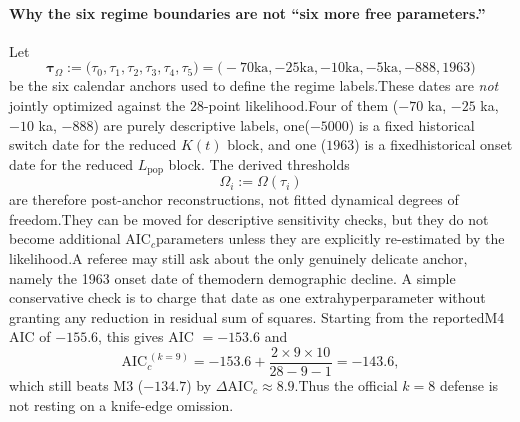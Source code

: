 \documentclass[11pt]{article}
\begin{document}
\paragraph{Why the six regime boundaries are not ``six more free parameters.''}
Let
\begin{equation}\boldsymbol{\tau}_{\Omega}:=\bigl(\tau_0,\tau_1,\tau_2,\tau_3,\tau_4,\tau_5\bigr)=\bigl(-70\mathrm{ka},-25\mathrm{ka},-10\mathrm{ka},-5\mathrm{ka},-888,1963\bigr)\tag{S4.3}\label{eq:S4_tauOmega}\end{equation}
be the six calendar anchors used to define the regime labels.These dates are \emph{not} jointly optimized against the 28-point likelihood.Four of them ($-70$ ka, $-25$ ka, $-10$ ka, $-888$) are purely descriptive labels, one($-5000$) is a fixed historical switch date for the reduced $K(t)$ block, and one ($1963$) is a fixedhistorical onset date for the reduced $L_{\mathrm{pop}}$ block. The derived thresholds
\begin{equation}\Omega_i := \Omega(\tau_i)\tag{S4.4}\label{eq:S4_Omegai_def}\end{equation}
are therefore post-anchor reconstructions, not fitted dynamical degrees of freedom.They can be moved for descriptive sensitivity checks, but they do not become additional AIC$_c$parameters unless they are explicitly re-estimated by the likelihood.A referee may still ask about the only genuinely delicate anchor, namely the 1963 onset date of themodern demographic decline. A simple conservative check is to charge that date as one extrahyperparameter without granting any reduction in residual sum of squares. Starting from the reportedM4 AIC of $-155.6$, this gives AIC $=-153.6$ and
\begin{equation}\mathrm{AIC}_c^{\,(k=9)}=-153.6 + \frac{2\times 9\times 10}{28-9-1}=-143.6,\tag{S4.5}\label{eq:S4_k9_check}\end{equation}
which still beats M3 ($-134.7$) by $\Delta\mathrm{AIC}_c\approx 8.9$.Thus the official $k=8$ defense is not resting on a knife-edge omission.
\end{document}
